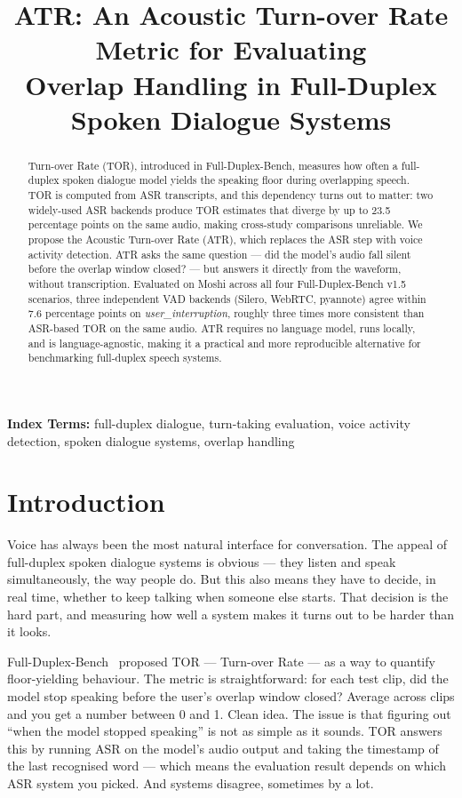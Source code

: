 \documentclass[a4paper]{article}
\title{ATR: An Acoustic Turn-over Rate Metric for Evaluating\\
       Overlap Handling in Full-Duplex Spoken Dialogue Systems}
\begin{document}
\maketitle

\begin{abstract}
Turn-over Rate (TOR), introduced in Full-Duplex-Bench, measures how often a
full-duplex spoken dialogue model yields the speaking floor during overlapping
speech. TOR is computed from ASR transcripts, and this dependency turns out to
matter: two widely-used ASR backends produce TOR estimates that diverge by up
to 23.5 percentage points on the same audio, making cross-study comparisons
unreliable. We propose the Acoustic Turn-over Rate (ATR), which replaces the
ASR step with voice activity detection. ATR asks the same question --- did the
model's audio fall silent before the overlap window closed? --- but answers it
directly from the waveform, without transcription. Evaluated on Moshi across
all four Full-Duplex-Bench v1.5 scenarios, three independent VAD backends
(Silero, WebRTC, pyannote) agree within 7.6 percentage points on
\emph{user\_interruption}, roughly three times more consistent than ASR-based
TOR on the same audio. ATR requires no language model, runs locally, and is
language-agnostic, making it a practical and more reproducible alternative for
benchmarking full-duplex speech systems.
\end{abstract}

\noindent\textbf{Index Terms:} full-duplex dialogue, turn-taking evaluation,
voice activity detection, spoken dialogue systems, overlap handling

\section{Introduction}
\label{sec:intro}

Voice has always been the most natural interface for conversation. The appeal
of full-duplex spoken dialogue systems is obvious --- they listen and speak
simultaneously, the way people do. But this also means they have to decide, in
real time, whether to keep talking when someone else starts. That decision is
the hard part, and measuring how well a system makes it turns out to be
harder than it looks.

Full-Duplex-Bench~\cite{lin2025fullduplex} proposed TOR --- Turn-over Rate ---
as a way to quantify floor-yielding behaviour. The metric is straightforward:
for each test clip, did the model stop speaking before the user's overlap
window closed? Average across clips and you get a number between 0 and 1.
Clean idea. The issue is that figuring out ``when the model stopped speaking''
is not as simple as it sounds. TOR answers this by running ASR on the model's
audio output and taking the timestamp of the last recognised word --- which
means the evaluation result depends on which ASR system you picked. And
systems disagree, sometimes by a lot.
\end{document}
